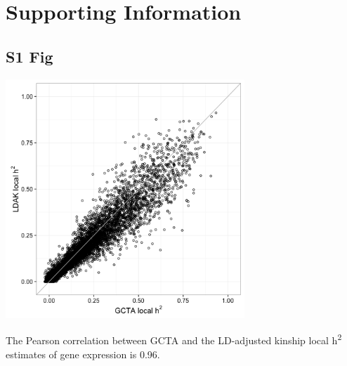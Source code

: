 \documentclass[10pt,letterpaper]{article}
\begin{document}


\section*{Supporting Information}

\begin{singlespace}


\subsection*{S1 Fig}
\includegraphics[width=9cm]{Figures/Fig-LDAK-gcta-no-cons.png}
\label{S1_Fig}

 The Pearson correlation between GCTA and the LD-adjusted kinship local h\textsuperscript{2} estimates of gene expression is 0.96.


\end{singlespace}
\end{document}
